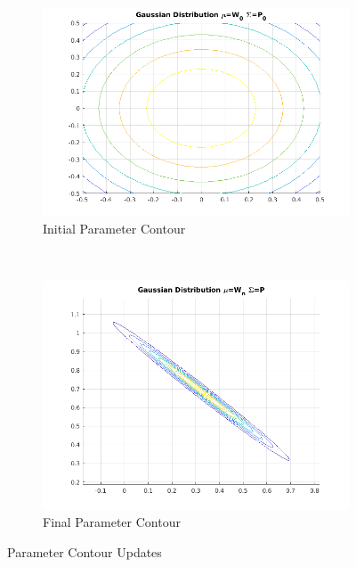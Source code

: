 \documentclass[11pt, fleqn]{article}
\begin{document}
\begin{figure}[!h]
    \centering
	\begin{subfigure}[b]{0.3\textwidth}
        \includegraphics[width=\textwidth]{kalman-parameter-contour-initial.png}
	\caption{Initial Parameter Contour}
	\label{fig:kalman-parameter-contour-initial}
    \end{subfigure}
    ~ 
	\begin{subfigure}[b]{0.3\textwidth}
        \includegraphics[width=\textwidth]{kalman-parameter-contour.png}
	\caption{Final Parameter Contour}
	\label{fig:kalman-parameter-contour}
    \end{subfigure}
	\caption{Parameter Contour Updates}
	\label{fig:kalman-parameter}
\end{figure}
\end{document}

